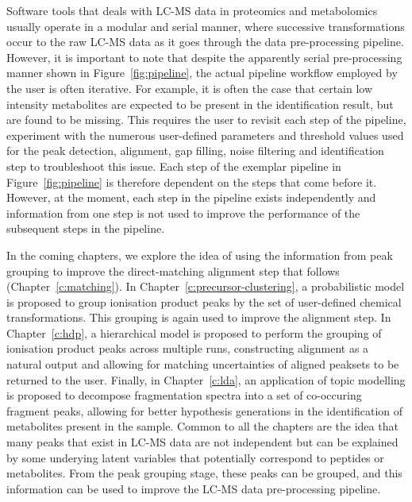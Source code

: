 Software tools that deals with LC-MS data in proteomics and metabolomics usually operate in a modular and serial manner, where successive transformations occur to the raw LC-MS data as it goes through the data pre-processing pipeline. However, it is important to note that despite the  apparently serial pre-processing manner shown in Figure~\ref{fig:pipeline}, the actual pipeline workflow employed by the user is often iterative. For example, it is often the case that certain low intensity metabolites are expected to be present in the identification result, but are found to be missing. This requires the user to revisit each step of the pipeline, experiment with the numerous user-defined parameters and threshold values used for the peak detection, alignment, gap filling, noise filtering and identification step to troubleshoot this issue. Each step of the exemplar pipeline in Figure~\ref{fig:pipeline} is therefore dependent on the steps that come before it. However, at the moment, each step in the pipeline exists independently and information from one step is not used to improve the performance of the subsequent steps in the pipeline. 

In the coming chapters, we explore the idea of using the information from peak grouping to improve the direct-matching alignment step that follows (Chapter~\ref{c:matching}). In Chapter~\ref{c:precursor-clustering}, a probabilistic model is proposed to group ionisation product peaks by the set of user-defined chemical transformations. This grouping is again used to improve the alignment step. In Chapter~\ref{c:hdp}, a hierarchical model is proposed to perform the grouping of ionisation product peaks across multiple runs, constructing alignment as a natural output and allowing for matching uncertainties of aligned peaksets to be returned to the user. Finally, in Chapter~\ref{c:lda}, an application of topic modelling is proposed to decompose fragmentation spectra into a set of co-occuring fragment peaks, allowing for better hypothesis generations in the identification of metabolites present in the sample. Common to all the chapters are the idea that many peaks that exist in LC-MS data are not independent but can be explained by some underying latent variables that potentially correspond to peptides or metabolites. From the peak grouping stage, these peaks can be grouped, and this information can be used to improve the LC-MS data pre-processing pipeline.